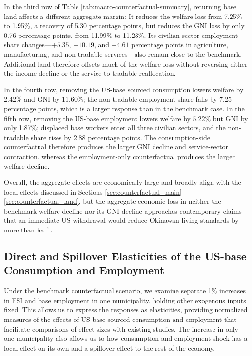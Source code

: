 \documentclass[12pt, unicode, a4paper]{article}
\newcommand{\1}{\mbox{1}\hspace{-0.25em}\mbox{l}} %
\begin{document}
In the third row of Table \ref{tab:macro-counterfactual-summary}, returning base land affects a different aggregate margin: It reduces the welfare loss from 7.25\% to 1.95\%, a recovery of 5.30 percentage points, but reduces the GNI loss by only 0.76 percentage points, from 11.99\% to 11.23\%. Its civilian-sector employment-share changes---$+5.35$, $+10.19$, and $-4.61$ percentage points in agriculture, manufacturing, and non-tradable services---also remain close to the benchmark. Additional land therefore offsets much of the welfare loss without reversing either the income decline or the service-to-tradable reallocation.

In the fourth row, removing the US-base sourced consumption lowers welfare by 2.42\% and GNI by 11.60\%; the non-tradable employment share falls by 7.25 percentage points, which is a larger response than in the benchmark case. 
In the fifth row, removing the US-base employment lowers welfare by 5.22\% but GNI by only 1.87\%; displaced base workers enter all three civilian sectors, and the non-tradable share rises by 2.88 percentage points. The consumption-side counterfactual therefore produces the larger GNI decline and service-sector contraction, whereas the employment-only counterfactual produces the larger welfare decline. 

Overall, the aggregate effects are economically large and broadly align with the local effects discussed in Sections \ref{sec:counterfactual_main}--\ref{sec:counterfactual_land}, but
the aggregate economic loss in neither the benchmark welfare decline nor its GNI decline approaches contemporary claims that an immediate US withdrawal would reduce Okinawan living standards by more than half \citep{toriyama09}.

\subsection{Direct and Spillover Elasticities of the US-base Consumption and Employment}
\label{sec:elasticity}

Under the benchmark counterfactual scenario, we examine separate 1\% increases in FSI and base employment in one municipality, holding other exogenous inputs fixed. This allows us to express the responses as elasticities, providing normalized measures of the effects of US-base-sourced consumption and employment that facilitate comparisons of effect sizes with existing studies. 
The increase in only one municipality also allows us to how consumption and employment shock has a local effect on its own and a spillover effect to the rest of the economy.
\end{document}
